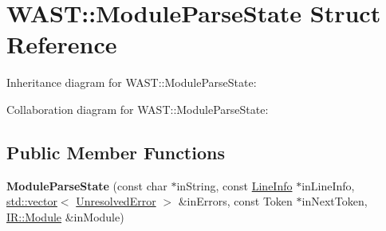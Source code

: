 \hypertarget{struct_w_a_s_t_1_1_module_parse_state}{}\section{W\+A\+ST\+:\+:Module\+Parse\+State Struct Reference}
\label{struct_w_a_s_t_1_1_module_parse_state}


Inheritance diagram for W\+A\+ST\+:\+:Module\+Parse\+State\+:


Collaboration diagram for W\+A\+ST\+:\+:Module\+Parse\+State\+:
\subsection*{Public Member Functions}
\begin{DoxyCompactItemize}
\item 
\mbox{\label{struct_w_a_s_t_1_1_module_parse_state_a76372901588b10e38760c813a7552028}} 
{\bfseries Module\+Parse\+State} (const char $\ast$in\+String, const \mbox{\hyperlink{struct_w_a_s_t_1_1_line_info}{Line\+Info}} $\ast$in\+Line\+Info, \mbox{\hyperlink{classstd_1_1vector}{std\+::vector}}$<$ \mbox{\hyperlink{struct_w_a_s_t_1_1_unresolved_error}{Unresolved\+Error}} $>$ \&in\+Errors, const Token $\ast$in\+Next\+Token, \mbox{\hyperlink{struct_i_r_1_1_module}{I\+R\+::\+Module}} \&in\+Module)
\end{DoxyCompactItemize}
